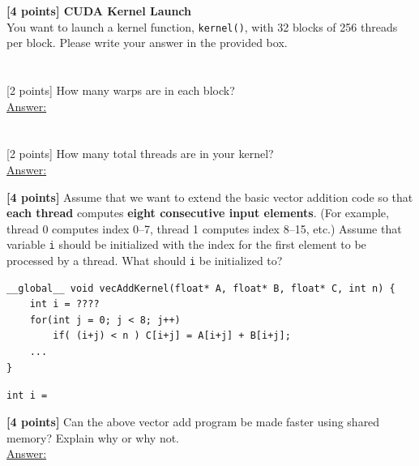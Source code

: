 \documentclass[12pt]{exam}
\newcommand{\Ans}{\underline{Answer:}\ }
\newcommand{\smallbox}{\framebox[5cm]{\rule{0pt}{1.1cm}}}
\newcommand{\widebox}[1][9.5cm]{\framebox[#1]{\rule{0pt}{1.1cm}}}
\newcommand{\paragraphbox}[1]{\framebox[\linewidth]{\rule{0pt}{#1}}}
\begin{document}
\newpage

\begin{questions}

\question \textbf{[4 points] CUDA Kernel Launch}\\
You want to launch a kernel function, \texttt{kernel()}, with 32 blocks of 256 threads per
block. Please write your answer in the provided box.
\begin{parts}
  \part {}[2 points] How many warps are in each block?\\[10pt]
        \Ans \smallbox
  \part {}[2 points] How many total threads are in your kernel?\\[10pt]
        \Ans \smallbox
\end{parts}

\vspace{8pt}
\question \textbf{[4 points]} Assume that we want to extend the basic vector addition code so
that \textbf{each thread} computes \textbf{eight consecutive input elements}. (For example,
thread 0 computes index 0--7, thread 1 computes index 8--15, etc.) Assume that variable
\texttt{i} should be initialized with the index for the first element to be processed by a
thread. What should \texttt{i} be initialized to?

\begin{Verbatim}[xleftmargin=2em]
__global__ void vecAddKernel(float* A, float* B, float* C, int n) {
    int i = ????
    for(int j = 0; j < 8; j++)
        if( (i+j) < n ) C[i+j] = A[i+j] + B[i+j];
    ...
}
\end{Verbatim}

\vspace{4pt}
\texttt{int i = }\,\widebox

\vspace{8pt}
\question \textbf{[4 points]} Can the above vector add program be made faster using shared
memory? Explain why or why not.\\[10pt]
\Ans \paragraphbox{2.6cm}


\end{questions}
\end{document}
